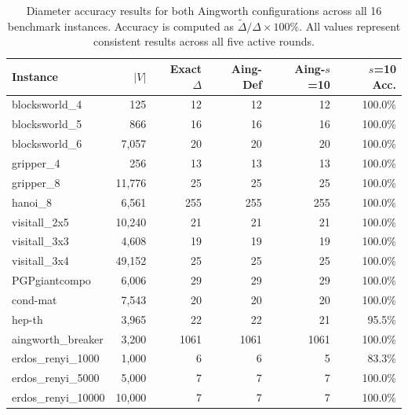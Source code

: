 \begin{table}[htbp]
\centering
\caption{Diameter accuracy results for both Aingworth configurations across all 16 benchmark instances. Accuracy is computed as $\tilde{\Delta} / \Delta \times 100\%$. All values represent consistent results across all five active rounds.}
\label{tab:accuracy}
\begin{tabular}{lrrrrr}
\hline
\textbf{Instance} & $|V|$ & \textbf{Exact $\Delta$} & \textbf{Aing-Def} & \textbf{Aing-$s$=10} & \textbf{$s$=10 Acc.} \\
\hline
blocksworld\_4     & 125    & 12   & 12   & 12   & 100.0\% \\
blocksworld\_5     & 866    & 16   & 16   & 16   & 100.0\% \\
blocksworld\_6     & 7,057  & 20   & 20   & 20   & 100.0\% \\
gripper\_4         & 256    & 13   & 13   & 13   & 100.0\% \\
gripper\_8         & 11,776 & 25   & 25   & 25   & 100.0\% \\
hanoi\_8           & 6,561  & 255  & 255  & 255  & 100.0\% \\
visitall\_2x5      & 10,240 & 21   & 21   & 21   & 100.0\% \\
visitall\_3x3      & 4,608  & 19   & 19   & 19   & 100.0\% \\
visitall\_3x4      & 49,152 & 25   & 25   & 25   & 100.0\% \\
PGPgiantcompo      & 6,006  & 29   & 29   & 29   & 100.0\% \\
cond-mat           & 7,543  & 20   & 20   & 20   & 100.0\% \\
hep-th             & 3,965  & 22   & 22   & 21   & 95.5\%  \\
aingworth\_breaker & 3,200  & 1061 & 1061 & 1061 & 100.0\% \\
erdos\_renyi\_1000  & 1,000  & 6    & 6    & 5    & 83.3\%  \\
erdos\_renyi\_5000  & 5,000  & 7    & 7    & 7    & 100.0\% \\
erdos\_renyi\_10000 & 10,000 & 7    & 7    & 7    & 100.0\% \\
\hline
\end{tabular}
\end{table}

